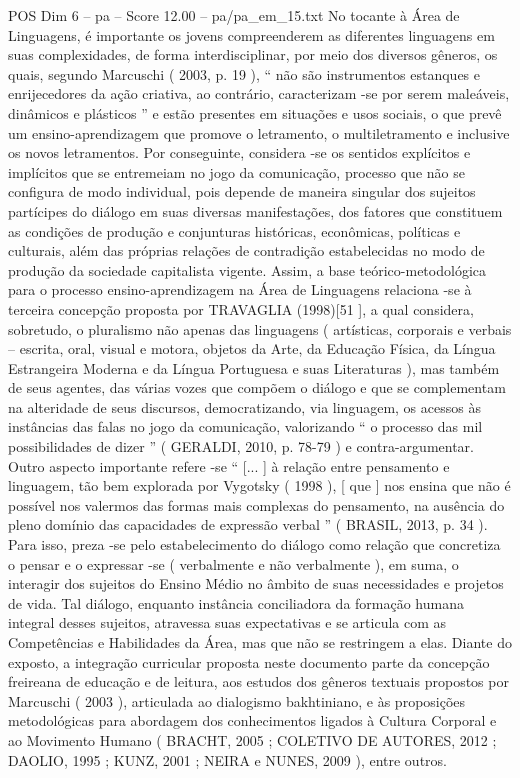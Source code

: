 \begin{textsample}{POS Dim 6 – pa – Score 12.00 – pa/pa\_em\_15.txt}
No tocante à Área de Linguagens, é importante os jovens compreenderem as diferentes linguagens em suas complexidades, de forma interdisciplinar, por meio dos diversos gêneros, os quais, segundo Marcuschi ( 2003, p. 19 ), “ não são instrumentos estanques e enrijecedores da ação criativa, ao contrário, caracterizam -se por serem maleáveis, dinâmicos e plásticos ” e estão presentes em situações e usos sociais, o que prevê um ensino-aprendizagem que promove o letramento, o multiletramento e inclusive os novos letramentos.
Por conseguinte, considera -se os sentidos explícitos e implícitos que se entremeiam no jogo da comunicação, processo que não se configura de modo individual, pois depende de maneira singular dos sujeitos partícipes do diálogo em suas diversas manifestações, dos fatores que constituem as condições de produção e conjunturas históricas, econômicas, políticas e culturais, além das próprias relações de contradição estabelecidas no modo de produção da sociedade capitalista vigente.
Assim, a base teórico-metodológica para o processo ensino-aprendizagem na Área de Linguagens relaciona -se à terceira concepção proposta por TRAVAGLIA (1998)[51 ], a qual considera, sobretudo, o pluralismo não apenas das linguagens ( artísticas, corporais e verbais – escrita, oral, visual e motora, objetos da Arte, da Educação Física, da Língua Estrangeira Moderna e da Língua Portuguesa e suas Literaturas ), mas também de seus agentes, das várias vozes que compõem o diálogo e que se complementam na alteridade de seus discursos, democratizando, via linguagem, os acessos às instâncias das falas no jogo da comunicação, valorizando “ o processo das mil possibilidades de dizer ” ( GERALDI, 2010, p. 78-79 ) e contra-argumentar.
Outro aspecto importante refere -se “ [... ] à relação entre pensamento e linguagem, tão bem explorada por Vygotsky ( 1998 ), [ que ] nos ensina que não é possível nos valermos das formas mais complexas do pensamento, na ausência do pleno domínio das capacidades de expressão verbal ” ( BRASIL, 2013, p. 34 ).
Para isso, preza -se pelo estabelecimento do diálogo como relação que concretiza o pensar e o expressar -se ( verbalmente e não verbalmente ), em suma, o interagir dos sujeitos do Ensino Médio no âmbito de suas necessidades e projetos de vida.
Tal diálogo, enquanto instância conciliadora da formação humana integral desses sujeitos, atravessa suas expectativas e se articula com as Competências e Habilidades da Área, mas que não se restringem a elas.
Diante do exposto, a integração curricular proposta neste documento parte da concepção freireana de educação e de leitura, aos estudos dos gêneros textuais propostos por Marcuschi ( 2003 ), articulada ao dialogismo bakhtiniano, e às proposições metodológicas para abordagem dos conhecimentos ligados à Cultura Corporal e ao Movimento Humano ( BRACHT, 2005 ; COLETIVO DE AUTORES, 2012 ; DAOLIO, 1995 ; KUNZ, 2001 ; NEIRA e NUNES, 2009 ), entre outros.

\end{textsample}

